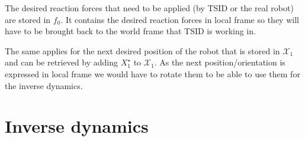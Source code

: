 \documentclass[a4paper,11pt]{article}
\begin{document}
The desired reaction forces that need to be applied (by TSID or the real robot) are stored in $f_0$. It contains the desired reaction forces in local frame so they will have to be brought back to the world frame that TSID is working in.

The same applies for the next desired position of the robot that is stored in $\mathcal{X}_1$ and can be retrieved by adding $X_1^\star$ to $\mathcal{X}_1$. As the next position/orientation is expressed in local frame we would have to rotate them to be able to use them for the inverse dynamics.

\section{Inverse dynamics}
\end{document}

